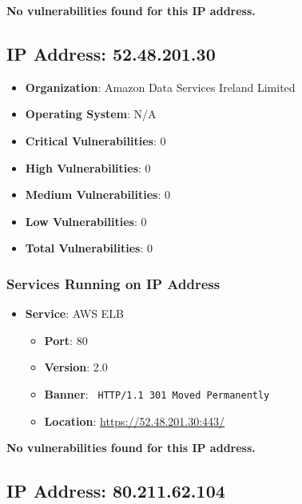\documentclass{article}
\begin{document}
\textbf{No vulnerabilities found for this IP address.}


\clearpage



\subsection*{IP Address: 52.48.201.30}

\begin{itemize}
    \item \textbf{Organization}: Amazon Data Services Ireland Limited
    \item \textbf{Operating System}:  N/A 
    \item \textbf{Critical Vulnerabilities}: 0
    \item \textbf{High Vulnerabilities}: 0
    \item \textbf{Medium Vulnerabilities}: 0
    \item \textbf{Low Vulnerabilities}: 0
    \item \textbf{Total Vulnerabilities}: 0
\end{itemize}

\subsubsection*{Services Running on IP Address}

\begin{itemize}
    
        \item \textbf{Service}: AWS ELB
        \begin{itemize}
            \item \textbf{Port}: 80
            \item \textbf{Version}:  2.0 
            \item \textbf{Banner}: \texttt{ HTTP/1.1 301 Moved Permanently
 }
            \item \textbf{Location}: \href{ https://52.48.201.30:443/ }{ https://52.48.201.30:443/ }
        \end{itemize}
    
\end{itemize}


\textbf{No vulnerabilities found for this IP address.}


\clearpage



\subsection*{IP Address: 80.211.62.104}
\end{document}
